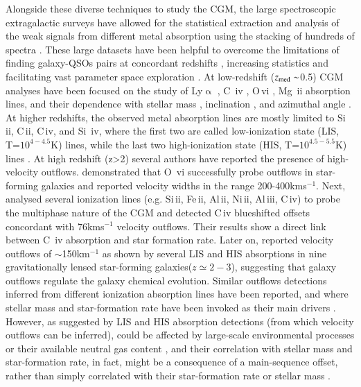 \documentclass[longauth]{aa}
\begin{document}
Alongside these diverse techniques to study the CGM, the large spectroscopic
extragalactic surveys have allowed for the statistical extraction and
analysis of the weak signals from different metal absorption using the
stacking of hundreds of spectra \citep{Steidel10}. These large datasets have
been helpful  to overcome the limitations of finding galaxy-QSOs pairs at
concordant redshifts \citep{Steidel94,Bouche07}, increasing statistics and
facilitating vast parameter space exploration 
\citep{York06,Bordoloi11,Zhu13a}. At low-redshift ($z_{\rm{med}}\sim$0.5) CGM
analyses have been focused on the study of Ly$\upalpha$ \citep{Chen01b}, C\,
{\sc iv} \citep{Chen01a}, O\,{\sc vi} \citep{Tumlinson11a}, Mg\,
{\sc ii} \citep{Bowen95,Bouche07,Steidel94} absorption lines, and their
dependence with stellar mass \citep{Bordoloi11}, inclination
\citep{Kacprzak10}, and azimuthal angle \citep{Shen12,Bordoloi14a}. At higher
redshifts, the observed metal absorption lines are mostly limited to Si\,
{\sc ii}, C\,{\sc ii}, C\,{\sc iv}, and Si\, {\sc iv}, where the first two
are called low-ionization state (LIS, T=$10^{4-4.5}$K) lines, while the last
two high-ionization state (HIS, T=$10^{4.5-5.5}$K) lines \citep
{Steidel10}. At high redshift (z>2) several authors have reported the
presence of high-velocity outflows. \cite{Lehner14} demonstrated that O\,
{\sc vi} successfully probe outflows in star-forming galaxies and reported
velocity widths in the range 200-400kms$^{-1}$. Next, \cite{Du16} analysed
several ionization lines (e.g. Si\,{\sc ii}, Fe\,{\sc ii}, Al\,{\sc ii},
Ni\,{\sc ii}, Al\,{\sc iii}, C\,{\sc iv}) to probe the multiphase nature of
the CGM and detected C\,{\sc iv} blueshifted offsets concordant  with
76kms$^{-1}$ velocity outflows. Their results show a direct link between C\,
{\sc iv} absorption and star formation rate. Later on, \cite
{Jones18} reported velocity outflows of $\sim$150km$^{-1}$ as shown by
several LIS and HIS absorptions in nine gravitationally lensed star-forming
galaxies($z\simeq2-3$), suggesting that galaxy outflows regulate the galaxy
chemical evolution. Similar outflows detections inferred from different
ionization absorption lines have been reported, and where stellar mass and
star-formation rate have been invoked as their main drivers \citep
{Zhu13a,Turner14,Trainor15,Gatkine19,Price20}. However, as suggested
by \cite{Dutta21} LIS and HIS absorption detections (from which velocity
outflows can be inferred), could be affected by large-scale environmental
processes \citep{Dutta21,WangS22} or their available neutral gas
content \citep{Berry12,Oyarzun16,Du18}, and their correlation with stellar
mass and star-formation rate, in fact, might be a consequence of a
main-sequence offset, rather than simply correlated with their
star-formation rate or stellar mass \citep{Cicone16,Gatkine22}.
\end{document}

